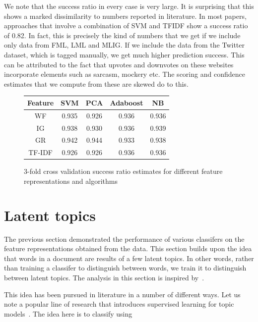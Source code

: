 \documentclass[11pt, letterpaper, conference, final, twocolumn]{ieeeconf}
\begin{document}
We note that the success ratio in every case is very large. It is surprising that this shows a marked dissimilarity to numbers reported in literature. In most papers, approaches that involve a combination of SVM and TFIDF show a success ratio of 0.82. In fact, this is precisely the kind of numbers that we get if we include only data from FML, LML and MLIG. If we include the data from the Twitter dataset, which is tagged manually, we get much higher prediction success. This can be attributed to the fact that upvotes and downvotes on these websites incorporate elements such as sarcasm, mockery etc. The scoring and confidence estimates that we compute from these are skewed do to this.

\begin{figure}[H]
\centering
\vspace{0.1in}
\begin{tabular}{ |c|c|c|c|c| }
  \hline
  Feature & SVM & PCA & Adaboost & NB \\[0.03in]
  \hline
  WF & 0.935 & 0.926 & 0.936 & 0.936\\
  IG & 0.938 & 0.930 & 0.936 & 0.939\\
  GR & 0.942 & 0.944 & 0.933 & 0.938\\
  TF-IDF & 0.926 & 0.926 & 0.936 & 0.936\\
  \hline
\end{tabular}
\caption{3-fold cross validation success ratio estimates for different feature representations and algorithms}
\label{tab:feature_alg}
\end{figure}


\section{Latent topics}
\label{sec:latent}

The previous section demonstrated the performance of various classifers on the feature representations obtained from the data. This section builds upon the idea that words in a document are results of a few latent topics. In other words, rather than training a classifer to distinguish between words, we train it to distinguish between latent topics. The analysis in this section is inspired by~\cite{nikolov2012nonparametric}.

This idea has been pursued in literature in a number of different ways. Let us note a popular line of research that introduces supervised learning for topic models~\cite{blei2010supervised}. The idea here is to classify using 
\end{document}

